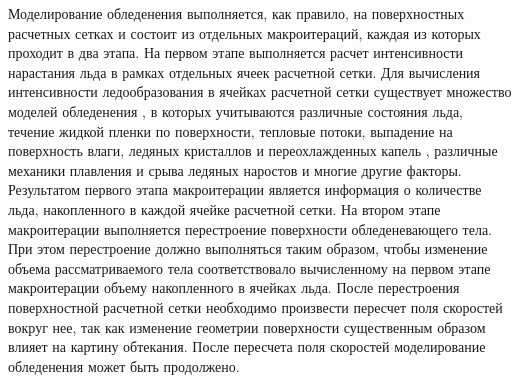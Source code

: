 Моделирование обледенения выполняется, как правило, на поверхностных расчетных сетках и состоит из отдельных макроитераций, каждая из которых проходит в два этапа.
На первом этапе выполняется расчет интенсивности нарастания льда в рамках отдельных ячеек расчетной сетки.
Для вычисления интенсивности ледообразования в ячейках расчетной сетки существует множество моделей обледенения \cite{Bartkus2018IntroIce,Zhang2017IntroIce,Pena2016IntroIce}, в которых учитываются различные состояния льда, течение жидкой пленки по поверхности, тепловые потоки, выпадение на поверхность влаги, ледяных кристаллов и переохлажденных капель \cite{Wang2023IntroIce,Liu2022IntroIce}, различные механики плавления и срыва ледяных наростов \cite{Ruan2023IntroIce} и многие другие факторы.
Результатом первого этапа макроитерации является информация о количестве льда, накопленного в каждой ячейке расчетной сетки.
На втором этапе макроитерации выполняется перестроение поверхности обледеневающего тела.
При этом перестроение должно выполняться таким образом, чтобы изменение объема рассматриваемого тела соответствовало вычисленному на первом этапе макроитерации объему накопленного в ячейках льда.
После перестроения поверхностной расчетной сетки необходимо произвести пересчет поля скоростей вокруг нее, так как изменение геометрии поверхности существенным образом влияет на картину обтекания.
После пересчета поля скоростей моделирование обледенения может быть продолжено.




